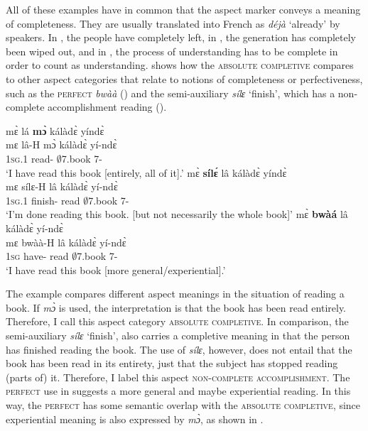 All of these examples have in common that the aspect marker conveys a meaning of completeness. They are usually translated into French as {\itshape déjà} `already' by speakers.  In , the people have completely left, in , the generation has completely been wiped out, and in , the process of understanding has to be complete in order to count as understanding.  shows how the \textsc{absolute completive} compares to other aspect categories that relate to notions of completeness or perfectiveness, such as the \textsc{perfect} {\itshape bwàà} () and the semi-auxiliary {\itshape sílɛ} `finish', which has a non-complete accomplishment reading (). 

\ea\label{MPL}
\ea \label{MPL1}
  \glll     mɛ̀ lá {\bfseries mɔ̀} kálàdɛ̀ yíndɛ̀ \\
          mɛ lâ-H mɔ̀ kálàdɛ̀ yí-ndɛ̀\\
           1\textsc{sg}.{\PST}1 read-{\R} {\COMPL} $\emptyset$7.book 7-{\ANA}  \\
    \trans `I have read this book [entirely, all of it].'
\ex\label{MPL2}
  \glll     mɛ̀ {\bfseries sílɛ́} lâ kálàdɛ̀ yíndɛ̀ \\
          mɛ sílɛ-H lâ kálàdɛ̀ yí-ndɛ̀ \\
           1\textsc{sg}.{\PST}1 finish-{\R} read $\emptyset$7.book 7-{\ANA}  \\
    \trans `I'm done reading this book. [but not necessarily the whole book]'
\ex\label{MPL3}
  \glll     mɛ̀ {\bfseries bwàá} lâ kálàdɛ̀ yí-ndɛ̀ \\
            mɛ bwàà-H lâ kálàdɛ̀ yí-ndɛ̀\\
          1\textsc{sg} have-{\R} read $\emptyset$7.book 7-{\ANA}  \\
    \trans `I have read this book [more general/experiential].'
\z
\z

\noindent The example compares different aspect meanings in the situation of reading a book. If {\itshape mɔ̀} is used, the interpretation is that the book has been read entirely. Therefore, I call this aspect category \textsc{absolute completive}. In comparison, the semi-auxiliary {\itshape sílɛ} `finish',   also carries a completive meaning in that the person has finished reading the book. The use of {\itshape sílɛ}, however, does not entail that the book has been read in its entirety, just that the subject has stopped reading (parts of) it. Therefore, I label this aspect  \textsc{non-complete accomplishment}. The \textsc{perfect} use in  suggests a more general and maybe experiential reading.
In this way, the \textsc{perfect} has some semantic overlap with the \textsc{absolute completive}, since  experiential meaning is also expressed by {\itshape mɔ̀}, as shown in .


